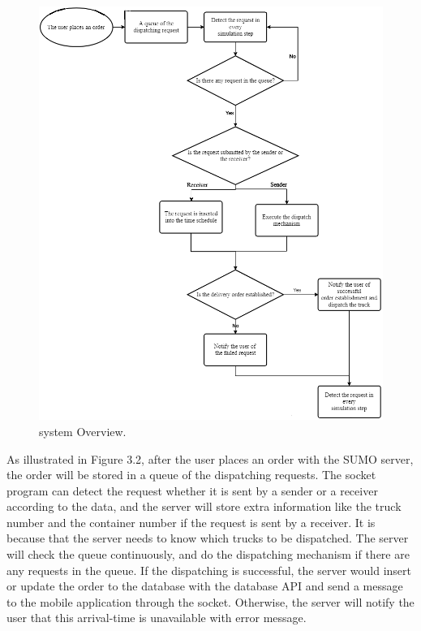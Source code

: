 \documentclass[12pt]{ksthesis}
\begin{document}
\begin{thesis}
{\begin{figure}[H]
\centering
\includegraphics[width=1.0\textwidth]{./figures/F3-2_Flowchart.PNG}
\caption{\large system Overview.}
\vspace{0.5cm}
\label{Fig:system_Overview}
\end{figure}




As illustrated in Figure 3.2, after the user places an order with the SUMO server, the order will be stored in a queue of the dispatching requests. The socket program can detect the request whether it is sent by a sender or a receiver according to the data, and the server will store extra information like the truck number and the container number if the request is sent by a receiver. 
It is because that the server needs to know which trucks to be dispatched. The server will check the queue continuously, and do the dispatching mechanism if there are any requests in the queue. If the dispatching is successful, the server would insert or update the order to the database with the database API and send a message to the mobile application through the socket. Otherwise, the server will notify the user that this arrival-time is unavailable with error message. 

}
\end{thesis}
\end{document}
